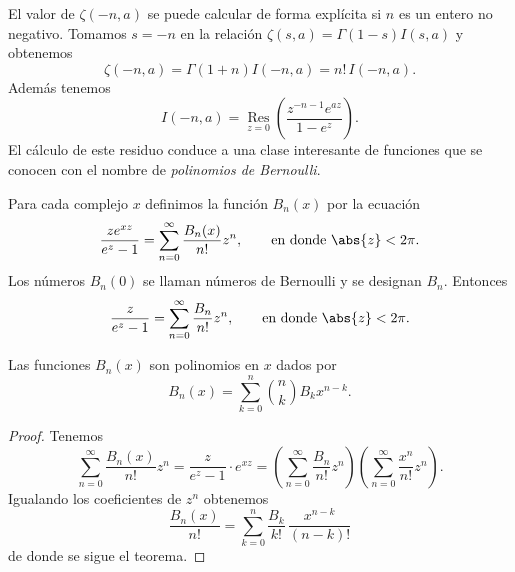 \documentclass[12pt,a4paper]{book}
\begin{document}
    El valor de $\zeta(-n,a)$ se puede calcular de forma explícita si $n$ es un entero no
    negativo. Tomamos $s=-n$ en la relación $\zeta(s,a)=\Gamma(1-s)I(s,a)$ y obtenemos
    \begin{equation*}
        \zeta(-n,a)=\Gamma(1+n)I(-n,a)=n!\,I(-n,a).
    \end{equation*}
    Además tenemos
    \begin{equation*}
        I(-n,a)=\operatorname*{Res}_{z=0}\left(\frac{z^{-n-1}e^{az}}{1-e^{z}}\right).
    \end{equation*}
    El cálculo de este residuo conduce a una clase interesante de funciones que se conocen
    con el nombre de \textit{polinomios de Bernoulli}.

    \begin{definicion}
        Para cada complejo $x$ definimos la función $B_{n}(x)$ por la ecuación
        \begin{equation*}
            \frac{ze^{xz}}{e^{z}-1}=\sum_{n=0}^{\infty}\frac{B_{n}(x)}{n!}z^{n},\qquad\text{en donde }\abs{z}<2\pi.
        \end{equation*}
        Los números $B_{n}(0)$ se llaman números de Bernoulli y se designan $B_{n}$. Entonces
        \begin{equation*}
            \frac{z}{e^{z}-1}=\sum_{n=0}^{\infty}\frac{B_{n}}{n!}z^{n},\qquad\text{en donde }\abs{z}<2\pi.
        \end{equation*}
    \end{definicion}

    \begin{teorema}\label{teo:12-12}
        Las funciones $B_{n}(x)$ son polinomios en $x$ dados por
        \begin{equation*}
            B_{n}(x)=\sum_{k=0}^{n}\binom{n}{k}B_{k}x^{n-k}.
        \end{equation*}
    \end{teorema}

    \begin{proof}
        Tenemos
        \begin{equation*}
            \sum_{n=0}^{\infty}\frac{B_{n}(x)}{n!}z^{n}=\frac{z}{e^{z}-1}\cdot e^{xz}=\left(\sum_{n=0}^{\infty}\frac{B_{n}}{n!}z^{n}\right)\left(\sum_{n=0}^{\infty}\frac{x^{n}}{n!}z^{n}\right).
        \end{equation*}
        Igualando los coeficientes de $z^{n}$ obtenemos
        \begin{equation*}
            \frac{B_{n}(x)}{n!}=\sum_{k=0}^{n}\frac{B_{k}}{k!}\,\frac{x^{n-k}}{(n-k)!}
        \end{equation*}
        de donde se sigue el teorema.
    \end{proof}
\end{document}
